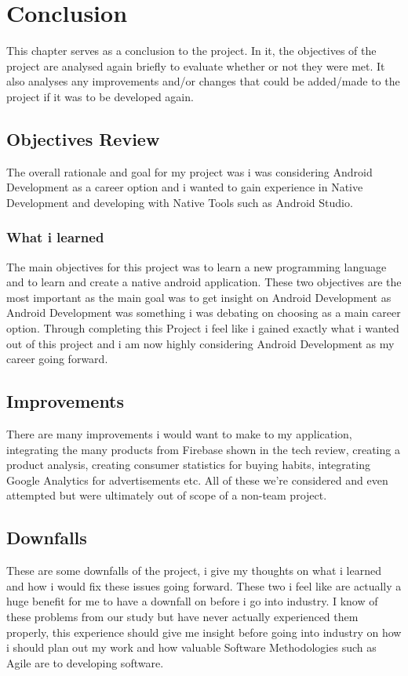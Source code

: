 \chapter{Conclusion}
This chapter serves as a conclusion to the project. In it, the objectives of the project are analysed again briefly to evaluate whether or not they were met. It also analyses any improvements and/or changes that could be added/made to the project if it was to be developed again.

\section{Objectives Review}
The overall rationale and goal for my project was i was considering Android Development as a career option and i wanted to gain experience in Native Development and developing with Native Tools such as Android Studio.\newline

\subsection{What i learned}
The main objectives for this project was to learn a new programming language and to learn and create a native android application. These two objectives are the most important as the main goal was to get insight on Android Development as Android Development was something i was debating on choosing as a main career option.
Through completing this Project i feel like i gained exactly what i wanted out of this project and i am now highly considering Android Development as my career going forward. 
\bigskip

\section{Improvements}
There are many improvements i would want to make to my application, integrating the many products from Firebase shown in the tech review, creating a product analysis, creating consumer statistics for buying habits, integrating Google Analytics for advertisements etc. All of these we're considered and even attempted but were ultimately out of scope of a non-team project.
\bigskip

\section{Downfalls}
These are some downfalls of the project, i give my thoughts on what i learned and how i would fix these issues going forward. These two i feel like are actually a huge benefit for me to have a downfall on before i go into industry. I know of these problems from our study but have never actually experienced them properly, this experience should give me insight before going into industry on how i should plan out my work and how valuable Software Methodologies such as Agile are to developing software.

